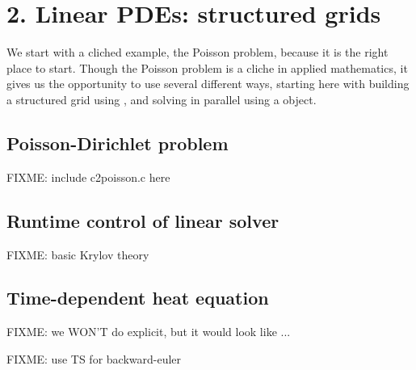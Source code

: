 
\chapter{2. Linear PDEs: structured grids}

We start with a cliched example, the Poisson problem, because it is the right place to start.  Though the Poisson problem is a cliche in applied mathematics, it gives us the opportunity to use \PETSc several different ways, starting here with building a structured grid using \PETSc \pDMDA, and solving in parallel using a \pKSP object.

\section{Poisson-Dirichlet problem}

FIXME: include c2poisson.c here

\section{Runtime control of linear solver}

FIXME: basic Krylov theory

\section{Time-dependent heat equation}

FIXME: we WON'T do explicit, but it would look like ...

FIXME: use TS for backward-euler
